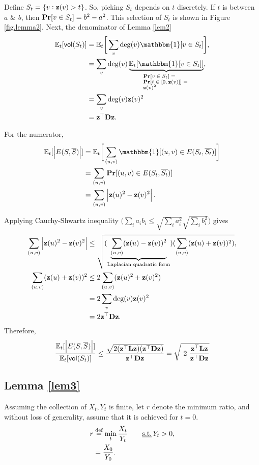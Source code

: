 \documentclass[11pt]{article}
\begin{document}
Define $S_t = \{v:\V{z}(v)>t\}$. So, picking $S_t$ depends on $t$ discretely. If $t$ is between $a$ \& $b$, then $\operatorname*{\bf Pr}[v \in S_t] = b^2 - a^2$. This selection of $S_t$ is shown in Figure \ref{fig.lemma2}. Next, the denominator of Lemma \ref{lem2}
\begin{align*}
\mathbb{E}_t[\vol(S_t)] &= \mathbb{E}_t\bigg[\sum_v\mathrm{deg}(v)\mathbbm{1}[v\in S_t]\bigg], \\
&= \sum_v \mathrm{deg}(v) \underbrace{\mathbb{E}_t[\mathbbm{1}[v\in S_t]]}_{\parbox{6.5em}{\raggedright\scriptsize$\pr[v \in S_t] =\pr[t \in [0,\V{z}(v)]] =\V{z}(v)^2$}}, \\
&= \sum_v \mathrm{deg}(v) \V{z}(v)^2 \\
&= \V{z}^{\top}\V{D}\V{z}.
\end{align*}

For the numerator,
\begin{align*}
\mathbb{E}_t[\abs{E(S,\overline{S})}] &= \mathbb{E}_t\bigg[\sum_{(u,v)}\mathbbm{1}[(u,v)\in E(S_t,\overline{S_t})]\bigg] \\
&= \sum_{(u,v)}\pr[(u,v) \in E(S_t,\overline{S_t})] \\
&= \sum_{(u,v)}\abs{\V{z}(u)^2-\V{z}(v)^2}.
\end{align*}

Applying Cauchy-Shwartz inequality $\bigg( \sum_ia_ib_i \leq \sqrt{\sum_ia_i^2} \sqrt{\sum_ib_i^2} \bigg)$ gives
\begin{align*}
\sum_{(u,v)}\abs{\V{z}(u)^2-\V{z}(v)^2} &\leq \sqrt{(\underbrace{\sum_{(u,v)}(\V{z}(u)-\V{z}(v))^2}_{\footnotesize \text{Laplacian quadratic form}})(\sum_{(u,v)}(\V{z}(u)+\V{z}(v))^2)}, \\
\sum_{(u,v)}(\V{z}(u)+\V{z}(v))^2 &\leq 2\sum_{(u,v)}(\V{z}(u)^2+\V{z}(v)^2) \\
&= 2\sum_v\text{deg}(v)\V{z}(v)^2 \\
&= 2\V{z}^{\top}\V{D}\V{z}.
\end{align*}
Therefore,
\begin{equation*}
\dfrac{\mathbb{E}_t[\abs{E(S,\overline{S})}]}{\mathbb{E}_t[\vol(S_t)]} \leq \dfrac{\sqrt{2(\V{z}^{\top}\V{L}\V{z})(\V{z}^{\top}\V{D}\V{z})}}{\V{z}^{\top}\V{D}\V{z}} = \sqrt{\ 2\ \dfrac{\V{z}^{\top}\V{L}\V{z}}{\V{z}^{\top}\V{D}\V{z}}}
\end{equation*}

\subsection{Lemma \ref{lem3}} \label{sec.lem3}
Assuming the collection of $X_t, Y_t$ is finite, let $r$ denote the
minimum ratio, and without loss of generality, assume that it is
achieved for $t=0.$
\begin{align*}
r & \stackrel{\textup{def}}{=} \min_t \dfrac{X_t}{Y_t} \qquad \text{\underline{s.t.}} \, Y_t>0, \\
&= \dfrac{X_0}{Y_0}.
\end{align*}
\end{document}

